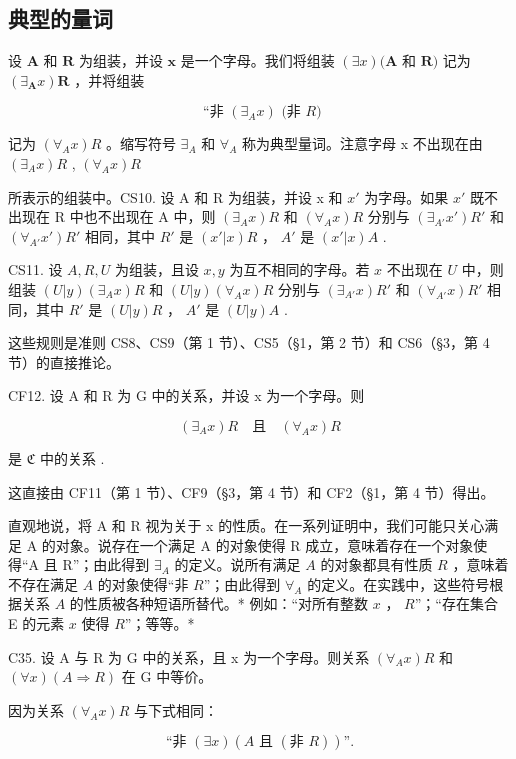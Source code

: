\subsection{典型的量词}

设 \(\pmb{A}\) 和 \(\pmb{R}\) 为组装，并设 \(\pmb{x}\) 是一个字母。我们将组装 \((\exists x)(\pmb{A}\) 和 \(\pmb{R})\) 记为 \((\exists_{\pmb{A}}x)\pmb{R}\) ，并将组装

\[
\text {   ``非   } (\exists_ {A} x) \text {   (非   } R)
\]

记为 \((\forall_{A}x)R\) 。缩写符号 \(\exists_{A}\) 和 \(\forall_{A}\) 称为典型量词。注意字母 x 不出现在由 \((\exists_{A}x)R\) , \((\forall_{A}x)R\)

所表示的组装中。CS10. 设 A 和 R 为组装，并设 x 和 \(x'\) 为字母。如果 \(x'\) 既不出现在 R 中也不出现在 A 中，则 \((\exists_{A}x)R\) 和 \((\forall_{A}x)R\) 分别与 \((\exists_{A'}x')R'\) 和 \((\forall_{A'}x')R'\) 相同，其中 \(R'\) 是 \((x'|x)R\) ， \(A'\) 是 \((x'|x)A\) .

CS11. 设 \(A, R, U\) 为组装，且设 \(x, y\) 为互不相同的字母。若 \(x\) 不出现在 \(U\) 中，则组装 \((U|y)(\exists_A x)R\) 和 \((U|y)(\forall_A x)R\) 分别与 \((\exists_{A'}x)R'\) 和 \((\forall_{A'}x)R'\) 相同，其中 \(R'\) 是 \((U|y)R\) ， \(A'\) 是 \((U|y)A\) .

这些规则是准则 CS8、CS9（第 1 节）、CS5（§1，第 2 节）和 CS6（§3，第 4 节）的直接推论。

CF12. 设 A 和 R 为 G 中的关系，并设 x 为一个字母。则

\[
(\exists_ {A} x) R \quad \text{且} \quad (\forall_ {A} x) R
\]

是 \(\mathfrak{C}\) 中的关系 .

这直接由 CF11（第 1 节）、CF9（§3，第 4 节）和 CF2（§1，第 4 节）得出。

直观地说，将 A 和 R 视为关于 x 的性质。在一系列证明中，我们可能只关心满足 A 的对象。说存在一个满足 A 的对象使得 R 成立，意味着存在一个对象使得“A 且 R”；由此得到 \(\exists_{A}\) 的定义。说所有满足 \(A\) 的对象都具有性质 \(R\) ，意味着不存在满足 \(A\) 的对象使得“非 \(R\)”；由此得到 \(\forall_{A}\) 的定义。在实践中，这些符号根据关系 \(A\) 的性质被各种短语所替代。* 例如：“对所有整数 \(x\) ， \(R\)”；“存在集合 E 的元素 \(x\) 使得 \(R\)”；等等。*

C35. 设 A 与 R 为 G 中的关系，且 x 为一个字母。则关系 \((\forall_{A}x)R\) 和 \((\forall x)(A\Longrightarrow R)\) 在 G 中等价。

因为关系 \((\forall_{A}x)R\) 与下式相同：

\[
\text{``非 } (\exists x) (A \text{ 且 } (\text{非 } R))\text{''}.
\]

